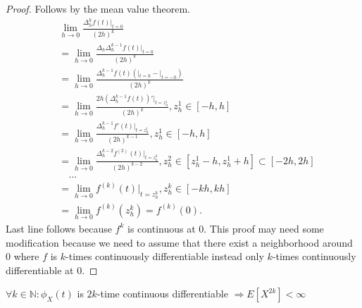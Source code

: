 \documentclass[a4paper,11pt]{article}
\begin{document}
\begin{proof}
    Follows by the mean value theorem.
    \begin{align}
         & \lim_{h \to 0} \frac{\Delta^{k}_{h} f(t)|_{t=0}}{(2h)^{k}}                                                                              \\
         & = \lim_{h \to 0} \frac{\Delta_{h}\Delta^{k-1}_{h} f(t)|_{t=0}}{(2h)^{k}}                                                                \\
         & = \lim_{h \to 0} \frac{\Delta^{k-1}_{h} f(t)(|_{t=h}-|_{t=-h})}{(2h)^{k}}                                                               \\
         & = \lim_{h \to 0} \frac{2h (\Delta^{k-1}_{h} f(t))'|_{t=z^{1}_{h}}}{(2h)^{k}}, z^{1}_{h} \in[-h,h]                                       \\
         & = \lim_{h \to 0} \frac{\Delta^{k-1}_{h} f'(t)|_{t=z^{1}_{h}}}{(2h)^{k-1}}, z^{1}_{h} \in[-h,h]                                          \\
         & = \lim_{h \to 0} \frac{\Delta^{k-2}_{h} f^{(2)}(t)|_{t=z^{2}_{h}}}{(2h)^{k-2}}, z^{2}_{h} \in[z^{1}_{h}-h,z^{1}_{h}+h] \subset [-2h,2h] \\
         & \quad ...                                                                                                                               \\
         & = \lim_{h \to 0} f^{(k)}(t)|_{t=z^{k}_{h}},  z^{k}_{h} \in [-k h, k h]                                                                  \\
         & = \lim_{h \to 0} f^{(k)}(z^{k}_{h}) = f^{(k)}(0).
    \end{align}
    Last line follows because $f^{k}$ is continuous at $0$. This proof may need some modification because we need to assume that there exist a neighborhood around $0$ where $f$ is $k$-times continuously differentiable instead only $k$-times continuously differentiable at $0$.
\end{proof}


\begin{lemma} \label{lemma:moment_smooth_char}
    $\forall k \in  \mathbb{N}:\phi_{X}(t)$ is $2k$-time continuous differentiable $\Rightarrow  E[X^{2k}] < \infty$
\end{lemma}
\end{document}
